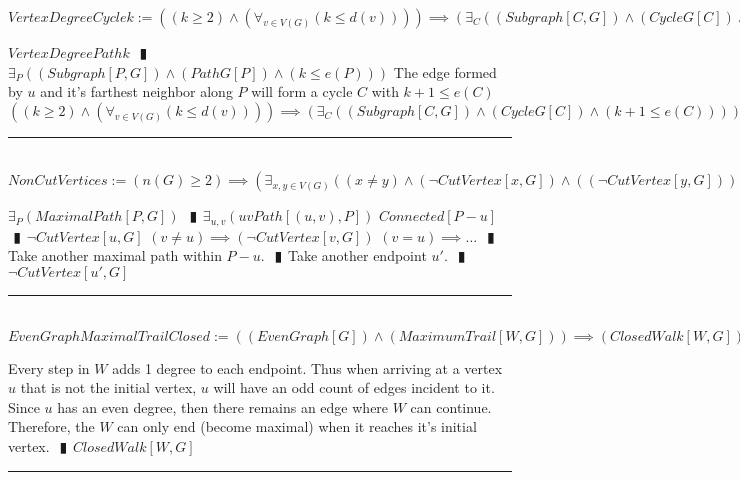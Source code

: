 \documentclass{book}
\newcommand{\abr}{:=}
\newcommand{\pipe}{$\phantom{(}\vrectangleblack\phantom{)}$}
\begin{document}
$VertexDegreeCyclek \abr ((k \geq 2) \land (\forall_{v \in V(G)}(k \leq d(v)))) \implies (\exists_{C}((Subgraph[C, G]) \land (CycleG[C]) \land (k + 1 \leq e(C))))$
\begin{enumerate}
  \lit $VertexDegreePathk$ \pipe $\exists_{P}((Subgraph[P, G]) \land (PathG[P]) \land (k \leq e(P)))$
  \lit The edge formed by $u$ and it's farthest neighbor along $P$ will form a cycle $C$ with $k + 1 \leq e(C)$
  \lit $((k \geq 2) \land (\forall_{v \in V(G)}(k \leq d(v)))) \implies (\exists_{C}((Subgraph[C, G]) \land (CycleG[C]) \land (k + 1 \leq e(C))))$
\end{enumerate} \vspace{.75mm} \hrule \vspace{.75mm} \ \\ 

$NonCutVertices \abr (n(G) \geq 2) \implies (\exists_{x, y \in V(G)}((x \neq y) \land (\lnot CutVertex[x, G]) \land ((\lnot CutVertex[y, G]))))$
\begin{enumerate}
  \lit $\exists_{P}(MaximalPath[P, G])$ \pipe $\exists_{u, v}(uvPath[(u, v), P])$
  \lit $Connected[P - u]$ \pipe $\lnot CutVertex[u, G]$
  \lit $(v \neq u) \implies (\lnot CutVertex[v, G])$
  \lit $(v = u) \implies \ldots$ \pipe Take another maximal path within $P - u$. \pipe Take another endpoint $u'$. \pipe $\lnot CutVertex[u', G]$
\end{enumerate} \vspace{.75mm} \hrule \vspace{.75mm} \ \\ 

$EvenGraphMaximalTrailClosed \abr ((EvenGraph[G]) \land (MaximumTrail[W, G])) \implies (ClosedWalk[W, G])$
\begin{enumerate}
  \lit Every step in $W$ adds 1 degree to each endpoint.
  \lit Thus when arriving at a vertex $u$ that is not the initial vertex, $u$ will have an odd count of edges incident to it.
  \lit Since $u$ has an even degree, then there remains an edge where $W$ can continue.
  \lit Therefore, the $W$ can only end (become maximal) when it reaches it's initial vertex. \pipe $ClosedWalk[W, G]$
\end{enumerate} \vspace{.75mm} \hrule \vspace{.75mm} \ \\ 
\end{document}
